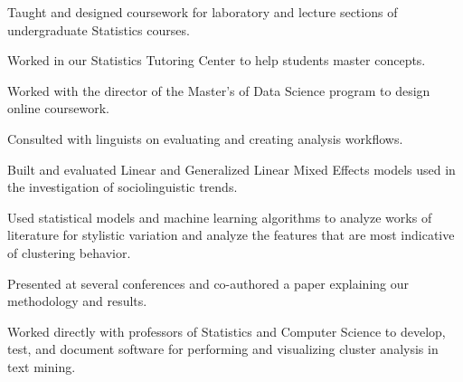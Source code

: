 \documentclass[letterpaper]{deedy-resume} %
\begin{document}
\begin{minipage}[t]{0.63\textwidth}


\begin{tightitemize}
\item Taught and designed coursework for laboratory and
  lecture sections of undergraduate Statistics courses.
\item Worked in our Statistics Tutoring Center to help students master
  concepts. 
\item Worked with the director of the Master's of Data Science program
  to design online coursework.
\end{tightitemize}

\sectionspace %


\begin{tightitemize}
\item Consulted with linguists on evaluating and creating analysis workflows.
\item Built and evaluated Linear and Generalized Linear Mixed Effects
  models used in the investigation of sociolinguistic trends.
\end{tightitemize}

\sectionspace %


\begin{tightitemize}
\item Used statistical models and machine learning  algorithms to analyze
  works of literature for stylistic variation and analyze the features
  that are most indicative of clustering behavior.
\item Presented at several conferences and co-authored a paper
  explaining our methodology and results.
\item Worked directly with professors of Statistics and Computer Science to
  develop, test, and document software for performing and visualizing
  cluster analysis in text mining.
\end{tightitemize}


\end{minipage}
\end{document}
